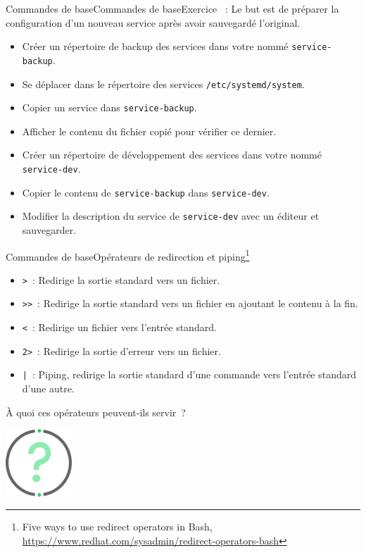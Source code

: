 \documentclass{beamer}
\begin{document}
    \begin{frame}{Commandes de base}{Commandes de base}{Exercice \execcounterdispinc{}~:}
        Le but est de préparer la configuration d'un nouveau service après avoir sauvegardé l'original.
        \begin{itemize}
            \item Créer un répertoire de backup des services dans votre  nommé \lstinline{service-backup}.
            \item Se déplacer dans le répertoire des services \lstinline{/etc/systemd/system}.
            \item Copier un service dans \lstinline{service-backup}.
            \item Afficher le contenu du fichier copié pour vérifier ce dernier.
            \item Créer un répertoire de développement des services dans votre  nommé \lstinline{service-dev}.
            \item Copier le contenu de \lstinline{service-backup} dans \lstinline{service-dev}.
            \item Modifier la description du service de \lstinline{service-dev} avec un éditeur et sauvegarder.
        \end{itemize}
    \end{frame}

    \begin{frame}{Commandes de base}{Opérateurs de redirection et piping\footnote{Five ways to use redirect operators in Bash, \url{https://www.redhat.com/sysadmin/redirect-operators-bash}}}
        \begin{itemize}
            \item \lstinline{>}~: Redirige la sortie standard vers un fichier.
            \item \lstinline{>>}~: Redirige la sortie standard vers un fichier en ajoutant le contenu à la fin.
            \item \lstinline{<}~: Redirige un fichier vers l'entrée standard.
            \item \lstinline{2>}~: Redirige la sortie d'erreur vers un fichier.
            \item \lstinline{|}~: Piping, redirige la sortie standard d'une commande vers l'entrée standard d'une autre.
        \end{itemize}
        À quoi ces opérateurs peuvent-ils servir~?
        \begin{center}
            \includegraphics[width=2.5cm]{image/question-mark}
        \end{center}
    \end{frame}
\end{document}
